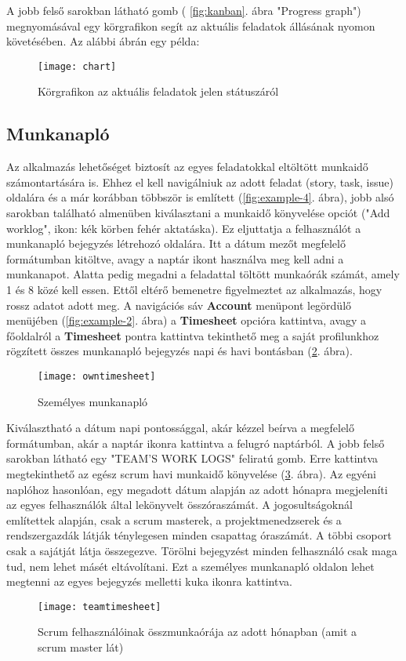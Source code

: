 A jobb felső sarokban látható gomb ( \ref{fig:kanban}. ábra "Progress graph") megnyomásával egy körgrafikon segít az aktuális feladatok állásának nyomon követésében. Az alábbi ábrán egy példa:

\begin{figure}[H]
	\centering
	\texttt{[image: chart]}
	\caption{Körgrafikon az aktuális feladatok jelen státuszáról}
	\label{fig:kanbanchart}
\end{figure}

\subsection{Munkanapló}
\label{worklog}

Az alkalmazás lehetőséget biztosít az egyes feladatokkal eltöltött munkaidő számontartására is. Ehhez el kell navigálniuk az adott feladat (story, task, issue) oldalára és a már korábban többször is említett (\ref{fig:example-4}. ábra), jobb alsó sarokban található almenüben kiválasztani a munkaidő könyvelése opciót ("Add worklog", ikon: kék körben fehér aktatáska). Ez eljuttatja a felhasználót a munkanapló bejegyzés létrehozó oldalára. Itt a dátum mezőt megfelelő formátumban kitöltve, avagy a naptár ikont használva meg kell adni a munkanapot. Alatta pedig megadni a feladattal töltött munkaórák számát, amely 1 és 8 közé kell essen. Ettől eltérő bemenetre figyelmeztet az alkalmazás, hogy rossz adatot adott meg. A navigációs sáv \textbf{Account} menüpont legördülő menüjében (\ref{fig:example-2}. ábra) a \textbf{Timesheet} opcióra kattintva, avagy a főoldalról a \textbf{Timesheet} pontra kattintva tekinthető meg a saját profilunkhoz rögzített összes munkanapló bejegyzés napi és havi bontásban (\ref{fig:personaltimesheet}. ábra).

\begin{figure}[H]
	\centering
	\texttt{[image: owntimesheet]}
	\caption{Személyes munkanapló}
	\label{fig:personaltimesheet}
\end{figure}

Kiválasztható a dátum napi pontossággal, akár kézzel beírva a megfelelő formátumban, akár a naptár ikonra kattintva a felugró naptárból. A jobb felső sarokban látható egy "TEAM'S WORK LOGS" feliratú gomb. Erre kattintva megtekinthető az egész scrum havi munkaidő könyvelése (\ref{fig:teamtimesheet}. ábra). Az egyéni naplóhoz hasonlóan, egy megadott dátum alapján az adott hónapra megjeleníti az egyes felhasználók által lekönyvelt összóraszámát. A jogosultságoknál említettek alapján, csak a scrum masterek, a projektmenedzserek és a rendszergazdák látják ténylegesen minden csapattag óraszámát. A többi csoport csak a sajátját látja összegezve. Törölni bejegyzést minden felhasználó csak maga tud, nem lehet másét eltávolítani. Ezt a személyes munkanapló oldalon lehet megtenni az egyes bejegyzés melletti kuka ikonra kattintva.

\begin{figure}[H]
	\centering
	\texttt{[image: teamtimesheet]}
	\caption{Scrum felhasználóinak összmunkaórája az adott hónapban (amit a scrum master lát)}
	\label{fig:teamtimesheet}
\end{figure}

\newpage
